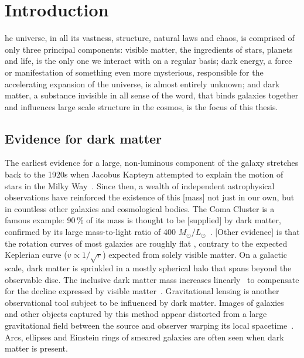 %
%
\let\textcircled=\pgftextcircled
\chapter{Introduction}
\label{chap:intro}


he universe, in all its vastness, structure, natural laws and chaos, is comprised of only three principal components: visible matter, the ingredients of stars, planets and life, is the only one we interact with on a regular basis; dark energy, a force or manifestation of something even more mysterious, responsible for the accelerating expansion of the universe, is almost entirely unknown; and dark matter, a substance invisible in all sense of the word, that binds galaxies together and influences large scale structure in the cosmos, is the focus of this thesis.


\section{Evidence for dark matter}
\label{sec:intro_dm_evidence}

The earliest evidence for a large, non-luminous component of the galaxy stretches back to the 1920s when Jacobus Kapteyn attempted to explain the motion of stars in the Milky Way~\cite{1922ApJ....55..302K}. Since then, a wealth of independent astrophysical observations have reinforced the existence of this [mass] not just in our own, but in countless other galaxies and cosmological bodies. The Coma Cluster is a famous example: 90\,\% of its mass is thought to be [supplied] by dark matter, confirmed by its large mass-to-light ratio of 400 $M_{\odot} / L_{\odot}$~\cite{Yozin:2015mla}. [Other evidence] is that the rotation curves of most galaxies are roughly flat \cite{1996MNRAS-281-27P}, contrary to the expected Keplerian curve ($v \propto 1/\sqrt{r}$) expected from solely visible matter. On a galactic scale, dark matter is sprinkled in a mostly spherical halo that spans beyond the observable disc. The inclusive dark matter mass increases linearly~\cite{2009arXiv0901.0632E} to compensate for the decline expressed by visible matter~\cite{1970ApJ-160-811F,1992AandA-256-19B}. Gravitational lensing is another observational tool subject to be influenced by dark matter. Images of galaxies and other objects captured by this method appear distorted from a large gravitational field between the source and observer warping its local spacetime~\cite{2010GReGr..42.2177H}. Arcs, ellipses and Einstein rings of smeared galaxies are often seen when dark matter is present.

